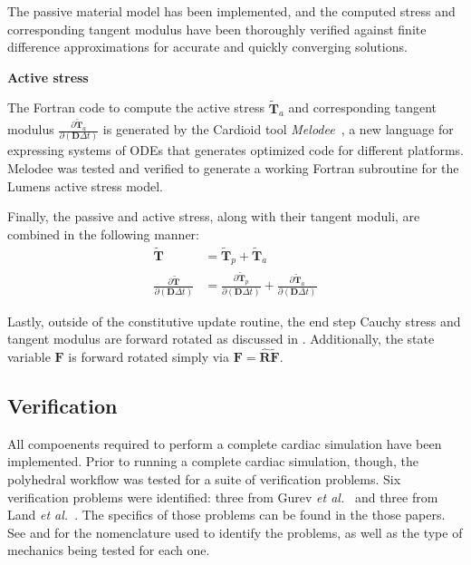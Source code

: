 The passive material model has been implemented, and the computed stress and corresponding tangent modulus have been thoroughly verified against finite difference approximations for accurate and quickly converging solutions.

\textbf{Active stress}

The Fortran code to compute the active stress $\tilde{\bm{T}}_a$ and corresponding tangent modulus $\frac{\partial \tilde{\bm{T}}_a}{\partial (\bm{D}\Delta{t})}$ is generated by the Cardioid tool \textit{Melodee}~\cite{melodee}, a new language for expressing systems of ODEs that generates optimized code for different platforms. Melodee was tested and verified to generate a working Fortran subroutine for the Lumens active stress model.

Finally, the passive and active stress, along with their tangent moduli, are combined in the following manner:
\begin{align}
\tilde{\bm{T}} &= \tilde{\bm{T}}_p + \tilde{\bm{T}}_a \\
\frac{\partial \tilde{\bm{T}}}{\partial (\bm{D}\Delta{t})} &= \frac{\partial \tilde{\bm{T}}_p}{\partial (\bm{D}\Delta{t})}+ \frac{\partial \tilde{\bm{T}}_a}{\partial (\bm{D}\Delta{t})}
\end{align}

Lastly, outside of the constitutive update routine, the end step Cauchy stress and tangent modulus are forward rotated as discussed in . Additionally, the state variable $\bm{F}$ is forward rotated simply via $\bm{F} =\hat{\bm{R}}\tilde{\bm{F}}$.


\subsection{Verification}

All compoenents required to perform a complete cardiac simulation have been implemented. Prior to running a complete cardiac simulation, though, the polyhedral workflow was tested for a suite of verification problems. Six verification problems were identified: three from Gurev \textit{et al.}~\cite{gurev_2015} and three from Land \textit{et al.}~\cite{land_2015}. The specifics of those problems can be found in the those papers. See  and  for the nomenclature used to identify the problems, as well as the type of mechanics being tested for each one.

